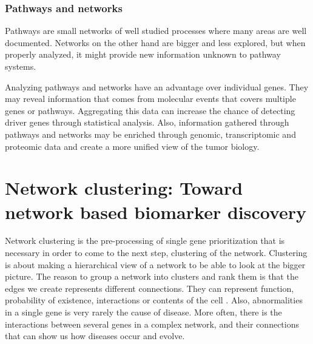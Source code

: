 \subsection{Pathways and networks}
Pathways are small networks of well studied processes where many areas are well
documented. Networks on the other hand are bigger and less explored, but when
properly analyzed, it might provide new information unknown to pathway systems.

Analyzing pathways and networks have an advantage over individual genes. They
may reveal information that comes from molecular events that covers multiple
genes or pathways. Aggregating this data can increase the chance of detecting
driver genes through statistical analysis. Also, information gathered through
pathways and networks may be enriched through genomic, transcriptomic and
proteomic data and create a more unified view of the tumor biology.

\chapter{Network clustering: Toward network based biomarker discovery}
Network clustering is the pre-processing of single gene prioritization that is
necessary in order to come to the next step, clustering of the network.
Clustering is about making a hierarchical view of a network to be able to look
at the bigger picture. The reason to group a network into clusters and rank them
is that the edges we create represents different connections. They can represent
function, probability of existence, interactions or contents of the cell
\cite{siri}. Also, abnormalities in a single gene is very rarely the cause of
disease. More often, there is the interactions between several genes in
a complex network\cite{disease-ppi}, and their connections that can show us how
diseases occur and evolve.

